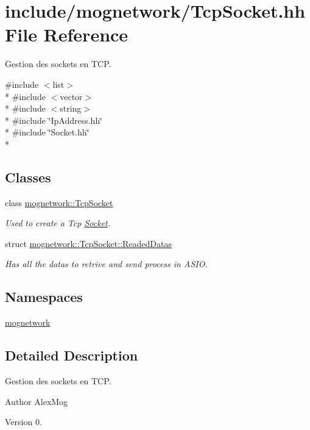 \hypertarget{_tcp_socket_8hh}{\section{include/mognetwork/\-Tcp\-Socket.hh File Reference}
\label{_tcp_socket_8hh}
}


Gestion des sockets en T\-C\-P.  


{\ttfamily \#include $<$list$>$}\\*
{\ttfamily \#include $<$vector$>$}\\*
{\ttfamily \#include $<$string$>$}\\*
{\ttfamily \#include \char`\"{}Ip\-Address.\-hh\char`\"{}}\\*
{\ttfamily \#include \char`\"{}Socket.\-hh\char`\"{}}\\*
\subsection*{Classes}
\begin{DoxyCompactItemize}
\item 
class \hyperlink{classmognetwork_1_1_tcp_socket}{mognetwork\-::\-Tcp\-Socket}
\begin{DoxyCompactList}\small\item\em Used to create a Tcp \hyperlink{classmognetwork_1_1_socket}{Socket}. \end{DoxyCompactList}\item 
struct \hyperlink{structmognetwork_1_1_tcp_socket_1_1_readed_datas}{mognetwork\-::\-Tcp\-Socket\-::\-Readed\-Datas}
\begin{DoxyCompactList}\small\item\em Has all the datas to retrive and send process in A\-S\-I\-O. \end{DoxyCompactList}\end{DoxyCompactItemize}
\subsection*{Namespaces}
\begin{DoxyCompactItemize}
\item 
\hyperlink{namespacemognetwork}{mognetwork}
\end{DoxyCompactItemize}


\subsection{Detailed Description}
Gestion des sockets en T\-C\-P. \begin{DoxyAuthor}{Author}
Alex\-Mog 
\end{DoxyAuthor}
\begin{DoxyVersion}{Version}
0. 
\end{DoxyVersion}
